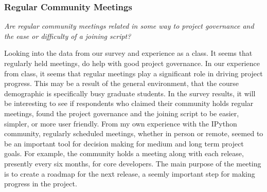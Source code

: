 \subsubsection{Regular Community Meetings}

{\it Are regular community meetings related in some way to project governance and the ease or difficulty of a joining script?}

Looking into the data from our survey and experience as a class. It seems that regularly held meetings, do help with good project governance. In our experience from class, it seems that regular meetings play a significant role in driving project progress. This may be a result of the general environment, that the course demographic is specifically busy graduate students. In the survey results, it will be interesting to see if respondents who claimed their community holds regular meetings, found the project governance and the joining script to be easier, simpler, or more user friendly. From my own experience with the IPython community, regularly scheduled meetings, whether in person or remote, seemed to be an important tool for decision making for medium and long term project goals. For example, the community holds a meeting along with each release, presently every six months, for core developers. The main purpose of the meeting is to create a roadmap for the next release, a seemly important step for making progress in the project.
